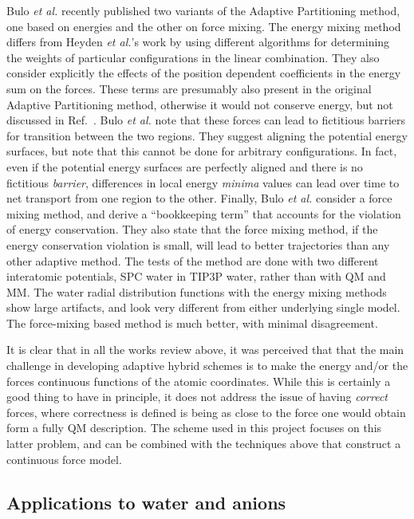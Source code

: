 \documentclass[11pt]{revtex4}
\begin{document}
Bulo {\it et al.} recently published two variants of the Adaptive
Partitioning method\cite{bulo_j_chem_theor_comp_2009a}, one based
on energies and the other on force mixing.  The energy mixing method
differs from Heyden {\it et al.}'s work by using different algorithms
for determining the weights of particular configurations in the
linear combination.  They also consider explicitly the effects of
the position dependent coefficients in the energy sum on the forces.
These terms are presumably also present in the original Adaptive
Partitioning method, otherwise it would not conserve energy, but
not discussed in Ref.~.   Bulo
{\it et al.} note that these forces can lead to fictitious barriers
for transition between the two regions.  They suggest aligning the
potential energy surfaces, but note that this cannot be done for
arbitrary configurations.  In fact, even if the potential energy
surfaces are perfectly aligned and there is no fictitious {\em
barrier}, differences in local energy {\em minima} values can lead
over time to net transport from one region to the other.  Finally,
Bulo {\it et al.} consider a force mixing method, and derive a
``bookkeeping term'' that accounts for the violation of energy
conservation.  They also state that the force mixing method, if the
energy conservation violation is small, will lead to better
trajectories than any other adaptive method.  The tests of the
method are done with two different interatomic potentials, SPC water
in TIP3P water, rather than with QM and MM.   The water radial
distribution functions with the energy mixing methods show large
artifacts, and look very different from either underlying single
model.  The force-mixing based method is much better, with minimal
disagreement.

It is clear that in all the works review above, it was perceived that that the main challenge in developing adaptive hybrid schemes is to make the energy and/or the forces continuous functions of the atomic coordinates. While this is certainly a good thing to have in principle, it does not address the issue of having {\em correct} forces, where correctness is defined is being as close to the force one would obtain form a fully QM description. The scheme used in this project focuses on this latter problem, and can be combined with the techniques above that construct a continuous force model. 


\subsection{Applications to water and anions}
\end{document}
